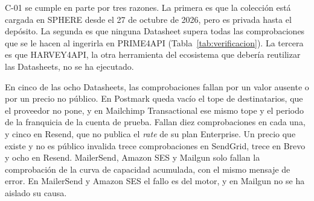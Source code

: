 C-01 se cumple en parte por tres razones.
La primera es que la colección está cargada en SPHERE desde el 27 de octubre de 2026, pero es privada hasta el depósito.
La segunda es que ninguna Datasheet supera todas las comprobaciones que se le hacen al ingerirla en PRIME4API (Tabla~\ref{tab:verificacion}).
La tercera es que HARVEY4API, la otra herramienta del ecosistema que debería reutilizar las Datasheets, no se ha ejecutado.

En cinco de las ocho Datasheets, las comprobaciones fallan por un valor ausente o por un precio no público.
En Postmark queda vacío el tope de destinatarios, que el proveedor no pone, y en Mailchimp Transactional ese mismo tope y el periodo de la franquicia de la cuenta de prueba.
Fallan diez comprobaciones en cada una, y cinco en Resend, que no publica el \textit{rate} de su plan Enterprise.
Un precio que existe y no es público invalida trece comprobaciones en SendGrid, trece en Brevo y ocho en Resend.
MailerSend, Amazon SES y Mailgun solo fallan la comprobación de la curva de capacidad acumulada, con el mismo mensaje de error.
En MailerSend y Amazon SES el fallo es del motor, y en Mailgun no se ha aislado su causa.
